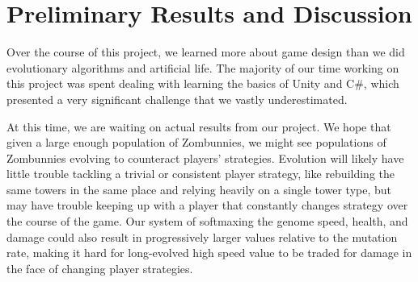 \documentclass[letterpaper]{article}
\begin{document}


\section{Preliminary Results and Discussion}
Over the course of this project, we learned more about game design than we did
evolutionary algorithms and artificial life. The majority of our time working on
this project was spent dealing with learning the basics of Unity and C\#, which
presented a very significant challenge that we vastly underestimated.

At this time, we are waiting on actual results from our project.
We hope that given a large enough population of Zombunnies, we might see
populations of Zombunnies evolving to counteract players' strategies. Evolution
will likely have little trouble tackling a trivial or consistent player
strategy, like rebuilding the same towers in the same place and
relying heavily on a single tower type, but may have trouble keeping
up with a player that constantly changes strategy over the course of the game.
Our system of softmaxing the genome speed, health, and damage could also
result in progressively larger values relative to the mutation rate, making it
hard for long-evolved high speed value to be traded for damage in the face of
changing player strategies.
\end{document}
